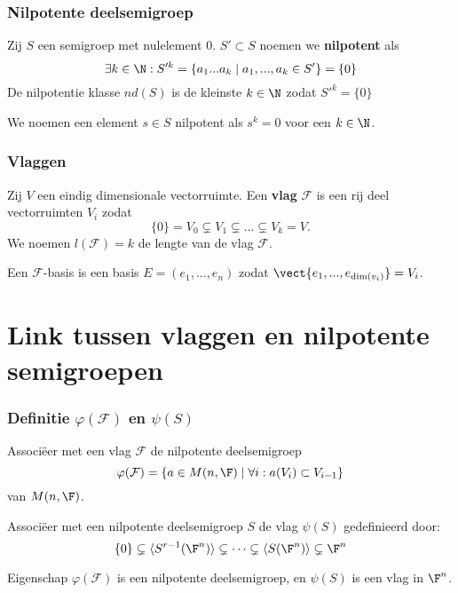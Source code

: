 \begin{frame}
\frametitle{Nilpotente deelsemigroep}

\begin{block}{}
Zij $S$ een semigroep met nulelement $0$. $S' \subset S$ noemen we \textbf{nilpotent} als 
$$\exists k \in \N : S'^k = \{ a_1...a_k \; | \; a_1, ..., a_k \in S' \} = \{0 \} $$
De nilpotentie klasse $nd(S)$ is de kleinste $k \in \N$ zodat $S'^k = \{ 0\}$
\end{block}

\begin{block}{}
We noemen een element $s \in S$ nilpotent als $s^k = 0$ voor een $k \in \N$.
\end{block}

\end{frame}

\begin{frame}
\frametitle{Vlaggen}

\begin{block}{}
Zij $V$ een eindig dimensionale vectorruimte. Een \textbf{vlag} $\mathcal{F}$ is een rij deel vectorruimten $V_i$ zodat 
$$\{ 0 \} = V_0 \subsetneq V_1 \subsetneq ... \subsetneq V_k = V.$$ 
We noemen $l(\mathcal{F}) = k$ de lengte van de vlag $\mathcal{F}$.

\end{block}

\begin{block}{}
Een $\mathcal{F}$-basis is een basis $E = (e_1, ..., e_n)$ zodat $ \vect \{e_1, ..., e_{\dim(v_i)} \} = V_i$.
\end{block}

\end{frame}


\section{Link tussen vlaggen en nilpotente semigroepen}

\begin{frame}
\frametitle{Definitie $\varphi(\mathcal{F})$ en $\psi(S)$}

\begin{block}{}
Associ\"eer met een vlag $\mathcal{F}$ de nilpotente deelsemigroep
$$\varphi (\mathcal{F}) = \{ a \in M(n,\F) \; | \; \forall i :  a(V_i) \subset V_{i-1} \}$$
van $M(n,\F)$.
\end{block}

\begin{block}{}
Associ\"eer met een nilpotente deelsemigroep $S$ de vlag $\psi (S) $ gedefinieerd door:
$$ \{0 \} \subsetneq \langle S^{r-1} (\F^n) \rangle \subsetneq \dots \subsetneq \langle S(\F^n)\rangle \subsetneq \F^n$$
\end{block}

\begin{block}{Eigenschap}
$\varphi(\mathcal{F})$ is een nilpotente deelsemigroep, en $\psi(S)$ is een vlag in $\F^n$.
\end{block}


\end{frame}


